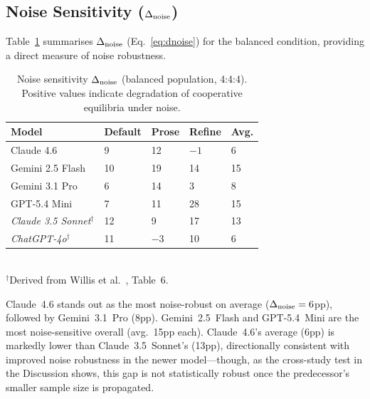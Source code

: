 \subsection{Noise Sensitivity ($\Delta_{\mathrm{noise}}$)}
\label{sec:noise}

Table~\ref{tab:noise} summarises $\Delta_{\mathrm{noise}}$ (Eq.~\ref{eq:dnoise})
for the balanced condition, providing a direct measure of noise robustness.

\begin{table}[h]
\caption{Noise sensitivity $\Delta_{\mathrm{noise}}$ (balanced population, 4:4:4).
         Positive values indicate degradation of cooperative equilibria under noise.}
\label{tab:noise}
\small
\begin{tabular}{@{}lllll@{}}
\toprule
\textbf{Model} & \textbf{Default} & \textbf{Prose} & \textbf{Refine} & \textbf{Avg.} \\
\midrule
Claude 4.6        & 9  & 12 & $-1$ & 6  \\
Gemini 2.5 Flash  & 10 & 19 & 14   & 15 \\
Gemini 3.1 Pro    & 6  & 14 & 3    & 8  \\
GPT-5.4 Mini      & 7  & 11 & 28   & 15 \\
\midrule
\textit{Claude 3.5 Sonnet}$^\dagger$ & 12 & 9 & 17 & 13 \\
\textit{ChatGPT-4o}$^\dagger$         & 11 & $-3$ & 10 & 6 \\
\bottomrule
\end{tabular}
\vspace{2pt}\\
\small$^\dagger$Derived from Willis et al.\ \cite{Willis2025_llm_ipd}, Table~6.
\end{table}

Claude~4.6 stands out as the most noise-robust on average ($\Delta_{\mathrm{noise}} = 6$pp),
followed by Gemini~3.1~Pro (8pp). Gemini~2.5~Flash and GPT-5.4~Mini are the
most noise-sensitive overall (avg.\ 15pp each). Claude~4.6's average (6pp)
is markedly lower than Claude~3.5~Sonnet's (13pp), directionally consistent
with improved noise robustness in the newer model---though, as the
cross-study test in the Discussion shows, this gap is not statistically
robust once the predecessor's smaller sample size is propagated.

